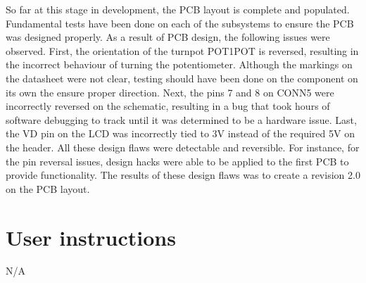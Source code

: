 \documentclass[bibtotocnumbered,abstract=on,paper=a4,fontsize=12pt,parskip=on,halfparskip=on]{scrartcl}		%
\begin{document}
 So far at this stage in development, the PCB layout is complete and populated. Fundamental tests have been done on each of the subsystems to ensure the PCB was designed properly. As a result of PCB design, the following issues were observed. First, the orientation of the turnpot POT1POT is reversed, resulting in the incorrect behaviour of turning the potentiometer. Although the markings on the datasheet were not clear, testing should have been done on the component on its own the ensure proper direction. Next, the pins 7 and 8 on CONN5 were incorrectly reversed on the schematic, resulting in a bug that took hours of software debugging to track until it was determined to be a hardware issue. Last, the VD pin on the LCD was incorrectly tied to 3V instead of the required 5V on the header. All these design flaws were detectable and reversible. For instance, for the pin reversal issues, design hacks were able to be applied to the first PCB to provide functionality. The results of these design flaws was to create a revision 2.0 on the PCB layout. 
  \clearpage
    
\newpage


\newpage
\appendix
\appendixpage
\addappheadtotoc
\section{User instructions}
N/A
  \clearpage
\end{document}
